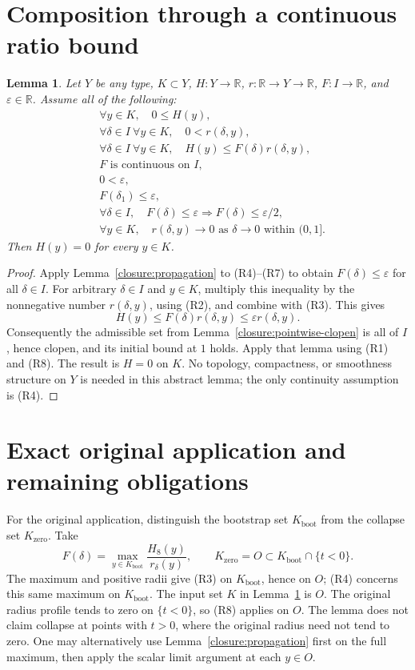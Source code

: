 \documentclass[11pt]{article}
\newtheorem{lemma}[theorem]{Lemma}
\theoremstyle{definition}
\theoremstyle{remark}
\newcommand{\R}{\mathbb R}
\numberwithin{equation}{section}
\providecommand{\I}{I}
\begin{document}
\section{Composition through a continuous ratio bound}
\begin{lemma}\label{closure:ratio-collapse}
Let $Y$ be any type, $K\subset Y$, $H:Y\to\R$,
$r:\R\to Y\to\R$, $F:\I\to\R$, and $\varepsilon\in\R$.
Assume all of the following:
\begin{align*}
 &\forall y\in K,\quad0\leq H(y),\tag{R1}\\
 &\forall\delta\in\I\ \forall y\in K,\quad0<r(\delta,y),\tag{R2}\\
 &\forall\delta\in\I\ \forall y\in K,\quad
      H(y)\leq F(\delta)r(\delta,y),\tag{R3}\\
 &F\text{ is continuous on }\I,\tag{R4}\\
 &0<\varepsilon,\tag{R5}\\
 &F(\delta_1)\leq\varepsilon,\tag{R6}\\
 &\forall\delta\in\I,\quad F(\delta)\leq\varepsilon
      \Longrightarrow F(\delta)\leq\varepsilon/2,\tag{R7}\\
 &\forall y\in K,\quad r(\delta,y)\longrightarrow0
       \text{ as }\delta\to0\text{ within }(0,1].\tag{R8}
\end{align*}
Then $H(y)=0$ for every $y\in K$.
\end{lemma}
\begin{proof}
Apply Lemma~\ref{closure:propagation} to (R4)--(R7) to obtain
$F(\delta)\leq\varepsilon$ for all $\delta\in\I$.
For arbitrary $\delta\in\I$ and $y\in K$, multiply this inequality
by the nonnegative number $r(\delta,y)$, using (R2), and combine with
(R3).  This gives
\[
 H(y)\leq F(\delta)r(\delta,y)\leq\varepsilon r(\delta,y).
\]
Consequently the admissible set from Lemma~\ref{closure:pointwise-clopen}
is all of $\I$, hence clopen, and its initial bound at $1$ holds.
Apply that lemma using (R1) and (R8).  The result is $H=0$ on $K$.
No topology, compactness, or smoothness structure on $Y$ is needed in
this abstract lemma; the only continuity assumption is (R4).
\end{proof}

\section{Exact original application and remaining obligations}
For the original application, distinguish the bootstrap set
$K_{\mathrm{boot}}$ from the collapse set $K_{\mathrm{zero}}$.
Take
\[
 F(\delta)=\max_{y\in K_{\mathrm{boot}}}
           \frac{H_8(y)}{r_\delta(y)},\qquad
 K_{\mathrm{zero}}=O\subset K_{\mathrm{boot}}\cap\{t<0\}.
\]
The maximum and positive radii give (R3) on $K_{\mathrm{boot}}$, hence
on $O$; (R4) concerns this same maximum on $K_{\mathrm{boot}}$.
The input set $K$ in Lemma~\ref{closure:ratio-collapse} is $O$.
The original radius profile tends to zero on $\{t<0\}$, so (R8)
applies on $O$.  The lemma does not claim collapse at points with
$t>0$, where the original radius need not tend to zero.
One may alternatively use Lemma~\ref{closure:propagation} first on the
full maximum, then apply the scalar limit argument at each $y\in O$.
\end{document}
